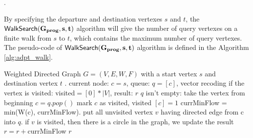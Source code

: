 \documentclass[a4paper,11pt]{article}
\begin{document}
\begin{defn}
.
\label{def:prog_adapt}
\\
%
%
%
\end{defn}  

By specifying the departure and destination vertexes $s$ and $t$, the $\mathsf{WalkSearch}(\bf{G_{prog}}, s, t)$ algorithm will 
give the number of query vertexes on a finite walk from $s$ to $t$, which contains the maximum number of query vertexes.
The pseudo-code of $\mathsf{WalkSearch}(\bf{G_{prog}}, s, t)$ algorithm is defined in the Algorithm \ref{alg:adpt_walk}.

\begin{algorithm}
\caption{
\label{alg:adpt_walk}
}
\begin{algorithmic}
\REQUIRE Weighted Directed Graph $G = (V, E, W, F)$ with a start vertex $s$ and destination vertex $t$ .
\STATE {} 
current node: $c = s$, 
queue: $q = [c]$, 
vector recoding if the vertex is visited: visited$ = [0]*|V|$,
result: $r$
\STATE {} $q$ isn't empty:
\STATE \qquad \qquad take the vertex from beginning $c= q.pop()$
\STATE \qquad \qquad mark $c$ as visited, visited $[c] = 1$
\STATE \qquad \qquad currMinFlow = min(W(c), currMinFlow).
\STATE \qquad \qquad put all unvisited vertex $v$ having directed edge from c into $q$. 
\STATE \qquad \qquad if $v$ is visited, then there is a circle in the graph, we update the result $r = r + $currMinFlow
\RETURN $r$
\end{algorithmic}
\end{algorithm}
\end{document}
